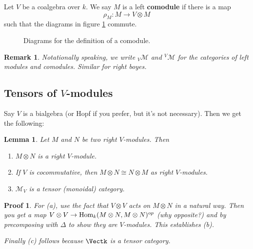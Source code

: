 \documentclass[12pt]{article}
\theoremstyle{break}
\theoremstyle{nonumberbreak}
\theoremstyle{changebreak}
\newtheorem{lem}[thm]{Lemma}
\theoremstyle{break}
\theoremstyle{nonumberbreak}
\newtheorem{prf}{Proof}
\theoremstyle{nonumberplain}
\theoremstyle{change}
\newtheorem{rmk}[thm]{Remark}
\DeclareMathOperator{\id}{id}
\newcommand*{\Hom}{\ensuremath\text{Hom}}
\begin{document}
\begin{defn}
	Let $V$ be a coalgebra over $k$. We say $M$ is a left \textbf{comodule} if there is a map
	\[\rho_M:M\to V\otimes M\]
	such that the diagrams in figure \ref{fig-com} commute.
\end{defn}
\begin{figure}[h]\label{fig-com}
	\caption{Diagrams for the definition of a comodule.}
\end{figure}

\begin{rmk}
	Notationally speaking, we write $_V\mathcal{M}$ and $^V\mathcal{M}$ for the categories of 
	left modules and comodules. Similar for right boyes.
\end{rmk}

\subsection{Tensors of $V$-modules}
Say $V$ is a bialgebra (or Hopf if you prefer, but it's not necessary). Then we get the following:
\begin{lem}
	Let $M$ and $N$ be two right $V$-modules. Then
	\begin{enumerate}
		\item $M\otimes N$ is a right $V$-module.
		\item If $V$ is cocommutative, then $M\otimes N\cong N\otimes M$ as right $V$-modules.
		\item $\mathcal{M}_V$ is a tensor (monoidal) category.
	\end{enumerate}
\end{lem}
\begin{prf}
	For (a), use the fact that $V\otimes V$ acts on $M\otimes N$ in a natural way. Then you get
	a map $V\otimes V\to \Hom_k(M\otimes N,M\otimes N)^{op}$ (why opposite?) and by precomposing
	with $\Delta$ to show they are $V$-modules. This establishes (b).

	Finally (c) follows because $\Vectk$ is a tensor category.
\end{prf}
\end{document}
